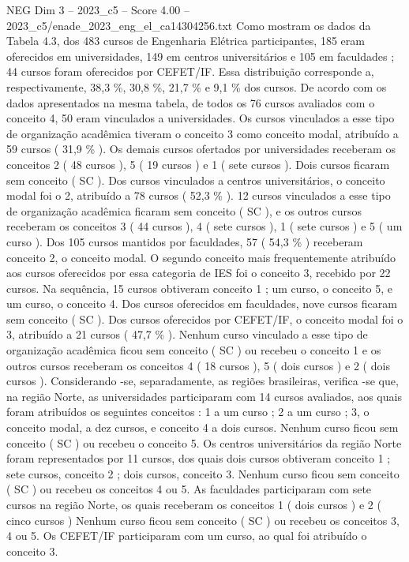 \begin{textsample}{NEG Dim 3 – 2023\_c5 – Score 4.00 – 2023\_c5/enade\_2023\_eng\_el\_ca14304256.txt}
Como mostram os dados da Tabela 4.3, dos 483 cursos de Engenharia Elétrica participantes, 185 eram oferecidos em universidades, 149 em centros universitários e 105 em faculdades ; 44 cursos foram oferecidos por CEFET/IF.
Essa distribuição corresponde a, respectivamente, 38,3 \%, 30,8 \%, 21,7 \% e 9,1 \% dos cursos.
De acordo com os dados apresentados na mesma tabela, de todos os 76 cursos avaliados com o conceito 4, 50 eram vinculados a universidades.
Os cursos vinculados a esse tipo de organização acadêmica tiveram o conceito 3 como conceito modal, atribuído a 59 cursos ( 31,9 \% ).
Os demais cursos ofertados por universidades receberam os conceitos 2 ( 48 cursos ), 5 ( 19 cursos ) e 1 ( sete cursos ).
Dois cursos ficaram sem conceito ( SC ).
Dos cursos vinculados a centros universitários, o conceito modal foi o 2, atribuído a 78 cursos ( 52,3 \% ). 12 cursos vinculados a esse tipo de organização acadêmica ficaram sem conceito ( SC ), e os outros cursos receberam os conceitos 3 ( 44 cursos ), 4 ( sete cursos ), 1 ( sete cursos ) e 5 ( um curso ).
Dos 105 cursos mantidos por faculdades, 57 ( 54,3 \% ) receberam conceito 2, o conceito modal.
O segundo conceito mais frequentemente atribuído aos cursos oferecidos por essa categoria de IES foi o conceito 3, recebido por 22 cursos.
Na sequência, 15 cursos obtiveram conceito 1 ; um curso, o conceito 5, e um curso, o conceito 4.
Dos cursos oferecidos em faculdades, nove cursos ficaram sem conceito ( SC ).
Dos cursos oferecidos por CEFET/IF, o conceito modal foi o 3, atribuído a 21 cursos ( 47,7 \% ).
Nenhum curso vinculado a esse tipo de organização acadêmica ficou sem conceito ( SC ) ou recebeu o conceito 1 e os outros cursos receberam os conceitos 4 ( 18 cursos ), 5 ( dois cursos ) e 2 ( dois cursos ).
Considerando -se, separadamente, as regiões brasileiras, verifica -se que, na região Norte, as universidades participaram com 14 cursos avaliados, aos quais foram atribuídos os seguintes conceitos : 1 a um curso ; 2 a um curso ; 3, o conceito modal, a dez cursos, e conceito 4 a dois cursos.
Nenhum curso ficou sem conceito ( SC ) ou recebeu o conceito 5.
Os centros universitários da região Norte foram representados por 11 cursos, dos quais dois cursos obtiveram conceito 1 ; sete cursos, conceito 2 ; dois cursos, conceito 3.
Nenhum curso ficou sem conceito ( SC ) ou recebeu os conceitos 4 ou 5.
As faculdades participaram com sete cursos na região Norte, os quais receberam os conceitos 1 ( dois cursos ) e 2 ( cinco cursos ) Nenhum curso ficou sem conceito ( SC ) ou recebeu os conceitos 3, 4 ou 5.
Os CEFET/IF participaram com um curso, ao qual foi atribuído o conceito 3.

\end{textsample}
